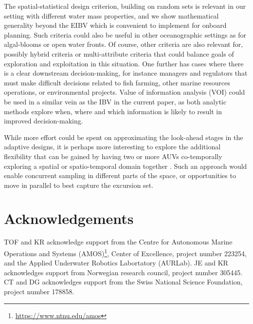 \documentclass[aoas]{imsart}
\begin{document}
The spatial-statistical design criterion, building on random sets is relevant
in our setting with different water mass properties, and we show mathematical generality beyond the EIBV which is convenient to implement for onboard planning. Such criteria could also
be useful in other oceanographic settings as for algal-blooms or
open water fronts. Of course, other criteria are also relevant for, possibly hybrid criteria or multi-attribute criteria that could balance goals of exploration and exploitation in this situation. One further has cases where there is a clear downstream
decision-making, for instance managers and regulators that must make difficult decisions related to fish farming, other marine resources
operations, or environmental projects. Value of information analysis
(VOI) \citep{Eidsvik:15} could be used in a similar vein as the IBV in
the current paper, as both analytic methods explore when, where and
which information is likely to result in improved decision-making.

While more effort could be spent on approximating the look-ahead stages
in the adaptive designs, it is perhaps more interesting to explore the
additional flexibility that can be gained by having two or more AUVs
co-temporally exploring a spatial or spatio-temporal domain together
\citep{ferreira2019advancing}. Such an approach would enable
concurrent sampling in different parts of the space, or opportunities
to move in parallel to best capture the excursion set.

\section*{Acknowledgements}

TOF and KR acknowledge support from the Centre for Autonomous Marine
Operations and Systems
(AMOS)\footnote{\url{https://www.ntnu.edu/amos}}, Center of
Excellence, project number 223254, and the Applied Underwater Robotics
Labortatory (AURLab). JE and KR acknowledges support from Norwegian research
council, project number 305445. CT and DG acknowledges support from the Swiss National Science Foundation, project number 178858.

\end{document}
